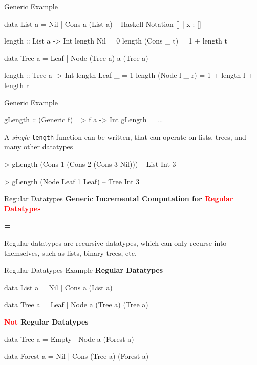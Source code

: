 \begin{slide}{Generic Example}
\begin{haskell}
data List a = Nil | Cons a (List a) -- Haskell Notation [] | x : [] 

length :: List a -> Int
length Nil        = 0
length (Cons _ t) = 1 + length t

data Tree a = Leaf | Node (Tree a) a (Tree a)

length :: Tree a -> Int
length Leaf _       = 1
length (Node l _ r) = 1 + length l + length r
\end{haskell}
\end{slide}

\begin{slide}{Generic Example}
\begin{chaskell}
gLength :: (Generic f) => f a -> Int
gLength = ...
\end{chaskell}

A \textit{single} \texttt{length} function can be written, that can operate on lists, trees, and many other datatypes

\vspace*{0.5cm}
\begin{haskell}
> gLength (Cons 1 (Cons 2 (Cons 3 Nil))) -- List Int
    3

> gLength (Node Leaf 1 Leaf) -- Tree Int
    3
\end{haskell}
\end{slide}


\begin{slide}{Regular Datatypes}
\centering
\large \textbf{Generic Incremental Computation for \textcolor{red}{Regular Datatypes}}

\vspace*{.5cm}
\textbf{=}
\vspace*{.5cm}

Regular datatypes are recursive datatypes, which can only recurse into themselves, such as lists, binary trees, etc. 

\end{slide}


\begin{slide}{Regular Datatypes Example}
\textbf{Regular Datatypes}

\begin{haskell}
data List a = Nil | Cons a (List a)

data Tree a = Leaf | Node a (Tree a) (Tree a)
\end{haskell}

\vspace*{0.5cm}
\textbf{\textcolor{red}{Not} Regular Datatypes}

\begin{haskell}
data Tree a = Empty | Node a (Forest a)

data Forest a = Nil | Cons (Tree a) (Forest a)
\end{haskell}
\end{slide}

